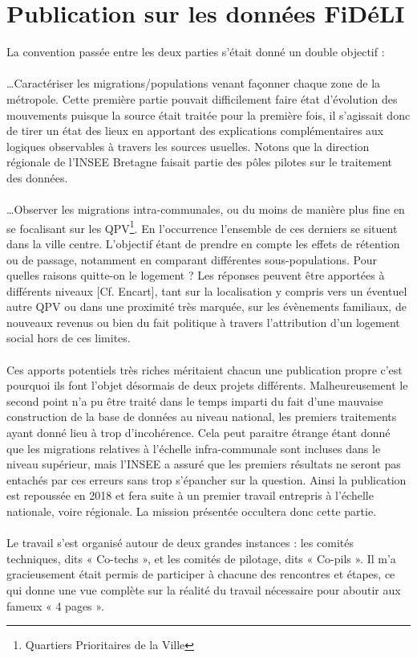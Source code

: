 \documentclass{bredele}
\begin{document}
\section{Publication sur les données FiDéLI}
La convention passée entre les deux parties s’était donné un double objectif : 
\\\\\ldots Caractériser les migrations/populations venant façonner chaque zone de la métropole. Cette première partie pouvait difficilement faire état d’évolution des mouvements puisque la source était traitée pour la première fois, il s’agissait donc de tirer un état des lieux en apportant des explications complémentaires aux logiques observables à travers les sources usuelles. Notons que la direction régionale de l’INSEE Bretagne faisait partie des pôles pilotes sur le traitement des données.
\\\\\ldots Observer les migrations intra-communales, ou du moins de manière plus fine en se focalisant sur les QPV\footnote{Quartiers Prioritaires de la Ville}. En l’occurrence l’ensemble de ces derniers se situent dans la ville centre. L’objectif étant de prendre en compte les effets de rétention ou de passage, notamment en comparant différentes sous-populations. Pour quelles raisons quitte-on le logement ? Les réponses peuvent être apportées à différents niveaux [Cf. Encart], tant sur la localisation y compris vers un éventuel autre QPV ou dans une proximité très marquée, sur les évènements familiaux, de nouveaux revenus ou bien du fait politique à travers l’attribution d’un logement social hors de ces limites.
\\\\Ces apports potentiels très riches méritaient chacun une publication propre c’est pourquoi ils font l’objet désormais de deux projets différents. Malheureusement le second point n’a pu être traité dans le temps imparti du fait d’une mauvaise construction de la base de données au niveau national, les premiers traitements ayant donné lieu à trop d’incohérence. Cela peut paraitre étrange étant donné que les migrations relatives à l’échelle infra-communale sont incluses dans le niveau supérieur, mais l’INSEE a assuré que les premiers résultats ne seront pas entachés par ces erreurs sans trop s’épancher sur la question. Ainsi la publication est repoussée en 2018 et fera suite à un premier travail entrepris à l’échelle nationale, voire régionale. La mission présentée occultera donc cette partie.
\\\\Le travail s’est organisé autour de deux grandes instances : les comités techniques, dits « Co-techs », et les comités de pilotage, dits « Co-pils ». Il m’a gracieusement était permis de participer à chacune des rencontres et étapes, ce qui donne une vue complète sur la réalité du travail nécessaire pour aboutir aux fameux « 4 pages ».
\end{document}
